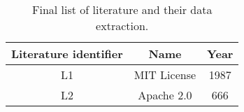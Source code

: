 
\begin{table}[h]
	\begin{center}
		\begin{tabular}{c | c | c} 
			\hline
			Literature identifier & Name & Year\\
			\hline
			L1 & MIT License & 1987 \\
			L2 & Apache 2.0 & 666 \\
		\end{tabular}
		\caption{Final list of literature and their data extraction.}
		\label{table:appendix:b}
	\end{center}
\end{table}